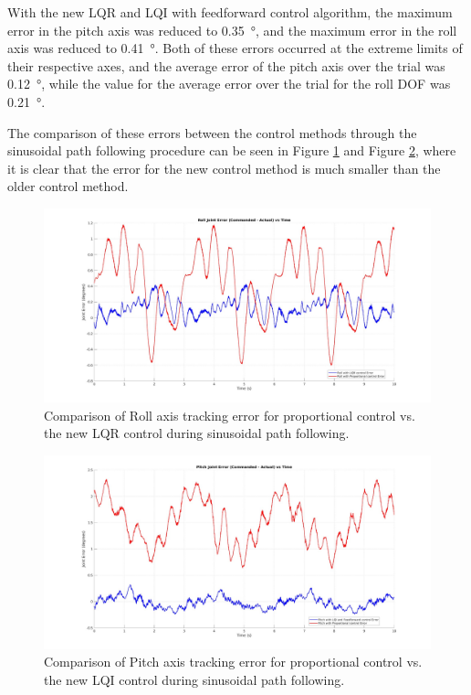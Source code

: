 With the new LQR and LQI with feedforward control algorithm, the maximum error in the pitch axis was reduced to \SI{0.35}{\degree}, and the maximum error in the roll axis was reduced to \SI{0.41}{\degree}. Both of these errors occurred at the extreme limits of their respective axes, and the average error of the pitch axis over the trial was \SI{0.12}{\degree}, while the value for the average error over the trial for the roll DOF was \SI{0.21}{\degree}.

The comparison of these errors between the control methods through the sinusoidal path following procedure can be seen in Figure \ref{fig:roll_sin_error} and Figure \ref{fig:pitch_sin_error}, where it is clear that the error for the new control method is much smaller than the older control method.

\begin{figure}[h!]
    \centering
    \includegraphics[width=1.00\linewidth]{figures/roll_sin_error.jpg}
    \caption{Comparison of Roll axis tracking error for proportional control vs. the new LQR control during sinusoidal path following.}
    \label{fig:roll_sin_error}
\end{figure}

\begin{figure}[h!]
    \centering
    \includegraphics[width=1.00\linewidth]{figures/pitch_sin_error.jpg}
    \caption{Comparison of Pitch axis tracking error for proportional control vs. the new LQI control during sinusoidal path following.}
    \label{fig:pitch_sin_error}
\end{figure}

